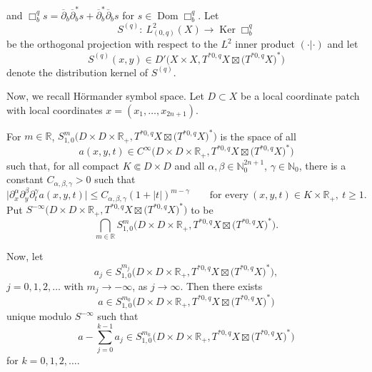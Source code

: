 \documentclass[pdftex]{sigma}
\numberwithin{equation}{section}
\newcommand{\Real}{\mathbb R}
\newcommand{\ddbar}{\overline\partial}
\newcommand{\pr}{\partial}
\newcommand{\ol}{\overline}
\newcommand{\abs}[1]{\left\vert#1\right\vert}
\newcommand{\To}{\rightarrow}
\begin{document}
	 and
$
	 		\Box^{q}_{b}s=\ddbar_{b}\ol{\pr}^{*}_{b}s+\ol{\pr}^{*}_{b}\ddbar_{b}s
 $ for $s\in \operatorname{Dom}\Box^q_{b} $.
	 Let
	 \[%
	 	S^{(q)}\colon\ L^2_{(0,q)}(X)\To\operatorname{Ker}\Box^q_b
	 \]
	 be the orthogonal projection with respect to the $L^2$ inner product $( \cdot | \cdot )$ and let
	 \[
	 S^{(q)}(x,y)\in{D}'\bigl(X\times X,T^{*0,q}X\boxtimes\bigl(T^{*0,q}X\bigr)^*\bigr)
	 \]
	 denote the distribution kernel of $S^{(q)}$.
	
	 Now, we recall H\"ormander symbol space. Let $D\subset X$ be a local coordinate patch with local coordinates $x=(x_1,\dots,x_{2n+1})$.
	
	 \begin{Definition}\label{d-gue140221a}
	 	For $m\in\Real$,
$
S^m_{1,0}\bigl(D\times D\times\mathbb{R}_+,T^{*0,q}X\boxtimes\bigl(T^{*0,q}X\bigr)^*\bigr)
$
	 	is the space of all
\[
a(x,y,t)\in{C}^\infty\bigl(D\times D\times\mathbb{R}_+,T^{*0,q}X\boxtimes\bigl(T^{*0,q}X\bigr)^*\bigr)
\]
	 	such that, for all compact $K\Subset D\times D$ and all $\alpha, \beta\in\mathbb N^{2n+1}_0$, $\gamma\in\mathbb N_0$,
	 	there is a constant $C_{\alpha,\beta,\gamma}>0$ such that
	 	\[\big|\pr^\alpha_x\pr^\beta_y\pr^\gamma_t a(x,y,t)\big|\leq C_{\alpha,\beta,\gamma}(1+\abs{t})^{m-\gamma} \qquad
	 	\text{for every}\ (x,y,t)\in K\times\Real_+, \ t\geq1.\]
	 	Put
$S^{-\infty}\bigl(D\times D\times\mathbb{R}_+,T^{*0,q}X\boxtimes\bigl(T^{*0,q}X\bigr)^*\bigr)$
	 	to be
	 	\[\bigcap_{m\in\Real}S^m_{1,0}\bigl(D\times D\times\mathbb{R}_+,T^{*0,q}X\boxtimes\bigl(T^{*0,q}X\bigr)^*\bigr).
	 	\]
	 	
	 	Now, let \[a_j\in S^{m_j}_{1,0}\bigl(D\times D\times\mathbb{R}_+,T^{*0,q}X\boxtimes\bigl(T^{*0,q}X\bigr)^*\bigr) ,\]
	 	$j=0,1,2,\dots$ with $m_j\To-\infty$, as $j\To\infty$.
	 	Then there exists \[a\in S^{m_0}_{1,0}\bigl(D\times D\times\mathbb{R}_+,T^{*0,q}X\boxtimes\bigl(T^{*0,q}X\bigr)^*\bigr)\]
	 	unique modulo $S^{-\infty}$ such that
	 	\[a-\sum^{k-1}_{j=0}a_j\in S^{m_k}_{1,0}\bigl(D\times D\times\mathbb{R}_+,T^{*0,q}X\boxtimes\bigl(T^{*0,q}X\bigr)^*\bigr)\]
	 	for $k=0,1,2,\dots$.
	 	

\end{Definition}
\end{document}
